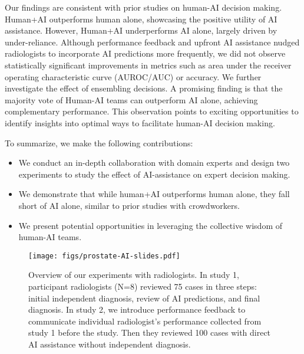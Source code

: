 Our findings are consistent with prior studies on human-AI decision making.
Human+AI outperforms human alone, showcasing the positive utility of AI assistance.
However, Human+AI underperforms AI alone, largely driven by under-reliance.
Although performance feedback and upfront AI assistance nudged radiologists to incorporate AI predictions more frequently, we did not observe statistically significant improvements in metrics such as area under the receiver operating characteristic curve (AUROC/AUC) or accuracy.
We further investigate the effect of ensembling decisions.
A promising finding is that the majority vote of Human-AI teams can outperform AI alone, achieving complementary performance.
This observation points to exciting opportunities to identify insights into optimal ways to facilitate human-AI decision making.


To summarize, we make the following contributions:
\begin{itemize}[nosep]
    \item We conduct an in-depth collaboration with domain experts and design two experiments to study the effect of AI-assistance on expert decision making.
    \item We demonstrate that while human+AI outperforms human alone, they fall short of AI alone, similar to prior studies with crowdworkers.
    \item We present potential opportunities in leveraging the collective wisdom of human-AI teams.
\end{itemize}

\begin{figure}[t]
    \centering
    \texttt{[image: figs/prostate-AI-slides.pdf]}
    \caption{Overview of our experiments with radiologists.
    In study 1, participant radiologists (N=8) reviewed 75 cases in three steps: initial independent diagnosis, review of AI predictions, and final diagnosis. In study 2, we introduce performance feedback to communicate individual radiologist's performance collected from study 1 before the study. Then they reviewed 100 cases with direct AI assistance without independent diagnosis. 
    }
    \label{fig:study_overview}
\end{figure}
